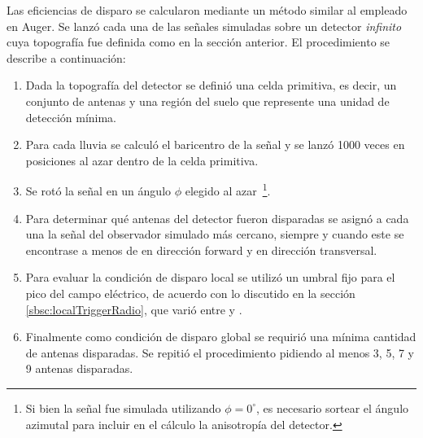 	Las eficiencias de disparo se calcularon mediante un m\'etodo similar al empleado en Auger.
	Se lanz\'o cada una de las se\~nales simuladas sobre un detector \emph{infinito} cuya topograf\'ia fue definida como en la secci\'on anterior.
	El procedimiento se describe a continuaci\'on:
	\begin{enumerate}
	 \item Dada la topograf\'ia del detector se defini\'o una celda primitiva, es decir, un conjunto de antenas y una regi\'on del suelo que represente una unidad de detecci\'on m\'inima.
	 \item Para cada lluvia se calcul\'o el baricentro de la se\~nal y se lanz\'o 1000 veces en posiciones al azar dentro de la celda primitiva.
	 \item Se rot\'o la se\~nal en un \'angulo $\phi$ elegido al azar~\footnote{Si bien la se\~nal fue simulada utilizando $\phi=0^\circ$, es necesario sortear el \'angulo azimutal para incluir en el c\'alculo la anisotrop\'ia del detector.}.
	 \item Para determinar qu\'e antenas del detector fueron disparadas se asign\'o a cada una la se\~nal del observador simulado m\'as cercano, siempre y cuando este se encontrase a menos de  en direcci\'on forward y  en direcci\'on transversal.
	 \item Para evaluar la condici\'on de disparo local se utiliz\'o un umbral fijo para el pico del campo el\'ectrico, de acuerdo con lo discutido en la secci\'on \ref{sbsc:localTriggerRadio}, que vari\'o entre  y .
	 \item Finalmente como condici\'on de disparo global se requiri\'o una m\'inima cantidad de antenas disparadas. Se repiti\'o el procedimiento pidiendo al menos 3, 5, 7 y 9 antenas disparadas.
	\end{enumerate}

